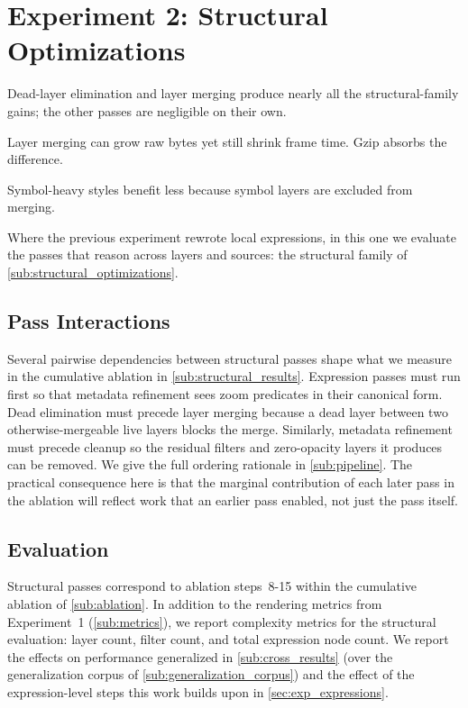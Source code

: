 \section{Experiment 2: Structural Optimizations}\label{sec:exp_structural}
\begin{keytakeaways}
\item Dead-layer elimination and layer merging produce nearly all the structural-family gains;\newline
      the other passes are negligible on their own.
\item Layer merging can grow raw bytes yet still shrink frame time.
Gzip absorbs the difference.
\item Symbol-heavy styles benefit less because symbol layers are excluded from merging.
\end{keytakeaways}

\noindent Where the previous experiment rewrote local expressions, in this one we evaluate the passes that reason across layers and sources: the structural family of \cref{sub:structural_optimizations}.

\subsection{Pass Interactions}\label{sub:structural_interactions}

Several pairwise dependencies between structural passes shape what we measure in the cumulative ablation in \cref{sub:structural_results}.
Expression passes must run first so that metadata refinement sees zoom predicates in their canonical form.
Dead elimination must precede layer merging because a dead layer between two otherwise-mergeable live layers blocks the merge.
Similarly, metadata refinement must precede cleanup so the residual  filters and zero-opacity layers it produces can be removed.
We give the full ordering rationale in \cref{sub:pipeline}.
The practical consequence here is that the marginal contribution of each later pass in the ablation will reflect work that an earlier pass enabled, not just the pass itself.

\subsection{Evaluation}\label{sub:structural_evaluation}

Structural passes correspond to ablation steps~8-15 within the cumulative ablation of \cref{sub:ablation}.
In addition to the rendering metrics from Experiment~1 (\cref{sub:metrics}), we report complexity metrics for the structural evaluation: layer count, filter count, and total expression node count.
We report the effects on performance generalized in \cref{sub:cross_results} (over the generalization corpus of \cref{sub:generalization_corpus}) and the effect of the expression-level steps this work builds upon in \cref{sec:exp_expressions}.


